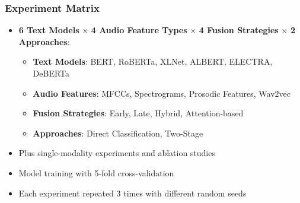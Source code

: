 \documentclass{beamer}
\begin{document}
\begin{frame}
\frametitle{Experiment Matrix}
\begin{itemize}
    \item \textbf{6 Text Models} × \textbf{4 Audio Feature Types} × \textbf{4 Fusion Strategies} × \textbf{2 Approaches}:
    \begin{itemize}
        \item \textbf{Text Models}: BERT, RoBERTa, XLNet, ALBERT, ELECTRA, DeBERTa
        \item \textbf{Audio Features}: MFCCs, Spectrograms, Prosodic Features, Wav2vec
        \item \textbf{Fusion Strategies}: Early, Late, Hybrid, Attention-based
        \item \textbf{Approaches}: Direct Classification, Two-Stage
    \end{itemize}
    \item Plus single-modality experiments and ablation studies
    \item Model training with 5-fold cross-validation
    \item Each experiment repeated 3 times with different random seeds
\end{itemize}
\end{frame}
\end{document}

